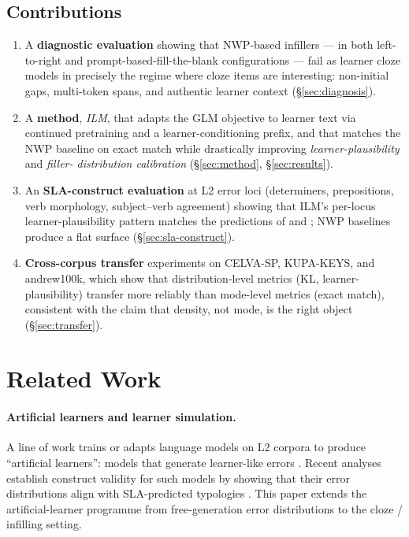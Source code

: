 \documentclass[11pt]{article}
\begin{document}
\subsection*{Contributions}
\begin{enumerate}[leftmargin=*,itemsep=0.25em]
    \item A \textbf{diagnostic evaluation} showing that NWP-based infillers
    --- in both left-to-right and prompt-based-fill-the-blank
    configurations --- fail as learner cloze models in precisely the regime
    where cloze items are interesting: non-initial gaps, multi-token spans,
    and authentic learner context (§\ref{sec:diagnosis}).
    \item A \textbf{method}, \emph{ILM}, that adapts the GLM objective to
    learner text via continued pretraining and a learner-conditioning
    prefix, and that matches the NWP baseline on exact match while
    drastically improving \emph{learner-plausibility} and \emph{filler-
    distribution calibration} (§\ref{sec:method}, §\ref{sec:results}).
    \item An \textbf{SLA-construct evaluation} at L2 error loci
    (determiners, prepositions, verb morphology, subject--verb agreement)
    showing that ILM's per-locus learner-plausibility pattern matches the
    predictions of \citet{goldschneider2001explaining} and
    \citet{pienemann1998language}; NWP baselines produce a flat surface
    (§\ref{sec:sla-construct}).
    \item \textbf{Cross-corpus transfer} experiments on CELVA-SP,
    KUPA-KEYS, and andrew100k, which show that distribution-level metrics
    (KL, learner-plausibility) transfer more reliably than mode-level
    metrics (exact match), consistent with the claim that density, not
    mode, is the right object (§\ref{sec:transfer}).
\end{enumerate}

\section{Related Work}
\label{sec:related}

\paragraph{Artificial learners and learner simulation.}
A line of work trains or adapts language models on L2 corpora to produce
``artificial learners'': models that generate learner-like errors
\citep{caines2023application,naismith2023automated,chollampatt2018neural}.
Recent analyses establish construct validity for such models by showing
that their error distributions align with SLA-predicted typologies
\citep[our CMCL-2026 companion work]{anonymous2026cmcl}. This paper extends
the artificial-learner programme from free-generation error distributions
to the cloze / infilling setting.
\end{document}
